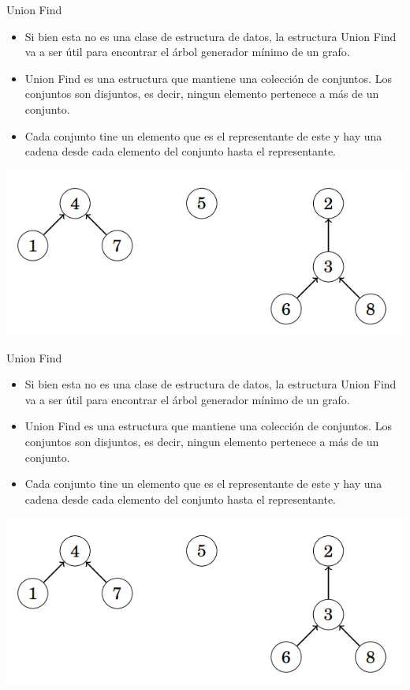 \documentclass{beamer}
\begin{document}
\begin{frame}{Union Find}
	\begin{itemize}
		\item Si bien esta no es una clase de estructura de datos, la estructura Union Find va a ser útil para encontrar el árbol generador mínimo de un grafo.
		\item Union Find es una estructura que mantiene una colección de conjuntos. Los conjuntos son disjuntos, es decir, ningun elemento pertenece a más de un conjunto.
		\item Cada conjunto tine un elemento que es el representante de este y hay una cadena desde cada elemento del conjunto hasta el representante.
	\end{itemize}
	\centering
	\includegraphics[scale=0.50]{figuras/union-find.PNG}
\end{frame}

\begin{frame}{Union Find}
	\begin{itemize}
		\item Si bien esta no es una clase de estructura de datos, la estructura Union Find va a ser útil para encontrar el árbol generador mínimo de un grafo.
		\item Union Find es una estructura que mantiene una colección de conjuntos. Los conjuntos son disjuntos, es decir, ningun elemento pertenece a más de un conjunto.
		\item Cada conjunto tine un elemento que es el representante de este y hay una cadena desde cada elemento del conjunto hasta el representante.
	\end{itemize}
	\centering
	\includegraphics[scale=0.50]{figuras/union-find.PNG}
\end{frame}
\end{document}
